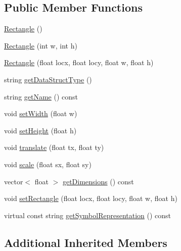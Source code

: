 \subsection*{Public Member Functions}
\begin{DoxyCompactItemize}
\item 
\hyperlink{classbridges_1_1datastructure_1_1_rectangle_a83c7e793c1335073c2a7093bbcf0c5bb}{Rectangle} ()
\item 
\hyperlink{classbridges_1_1datastructure_1_1_rectangle_a6e76090c00b4db625e96e4e23015acba}{Rectangle} (int w, int h)
\item 
\hyperlink{classbridges_1_1datastructure_1_1_rectangle_a65c907743708bbbece5ce86a935208a3}{Rectangle} (float locx, float locy, float w, float h)
\item 
string \hyperlink{classbridges_1_1datastructure_1_1_rectangle_a0c3b70d1d4d8ea9879eeb70a45c68d5a}{get\+Data\+Struct\+Type} ()
\item 
string \hyperlink{classbridges_1_1datastructure_1_1_rectangle_aee4fa283fa95e8c3b9f8efd5b19427b8}{get\+Name} () const
\item 
void \hyperlink{classbridges_1_1datastructure_1_1_rectangle_a7f6182e74816a6c7cf83ae49d5ed55be}{set\+Width} (float w)
\item 
void \hyperlink{classbridges_1_1datastructure_1_1_rectangle_a6a3e99759282dd822c5615d1643f2a81}{set\+Height} (float h)
\item 
void \hyperlink{classbridges_1_1datastructure_1_1_rectangle_a910c2a92c38e2e13bde3f1fd51b17316}{translate} (float tx, float ty)
\item 
void \hyperlink{classbridges_1_1datastructure_1_1_rectangle_ae17021407556e0d434b54a81d94614b3}{scale} (float sx, float sy)
\item 
vector$<$ float $>$ \hyperlink{classbridges_1_1datastructure_1_1_rectangle_a60e75bd0d064c63a726134cd5ca0b827}{get\+Dimensions} () const
\item 
void \hyperlink{classbridges_1_1datastructure_1_1_rectangle_a01e49a75f3826ea63e581d3669e3626b}{set\+Rectangle} (float locx, float locy, float w, float h)
\item 
virtual const string \hyperlink{classbridges_1_1datastructure_1_1_rectangle_ada89ed40d2515a3518084f5460ba8dac}{get\+Symbol\+Representation} () const
\end{DoxyCompactItemize}
\subsection*{Additional Inherited Members}


